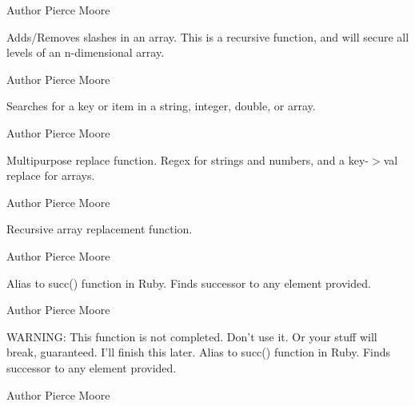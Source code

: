 \begin{DoxyAuthor}{Author}
Pierce Moore
\end{DoxyAuthor}
Adds/\-Removes slashes in an array. This is a recursive function, and will secure all levels of an n-\/dimensional array.

\begin{DoxyAuthor}{Author}
Pierce Moore
\end{DoxyAuthor}
Searches for a key or item in a string, integer, double, or array.

\begin{DoxyAuthor}{Author}
Pierce Moore
\end{DoxyAuthor}
Multipurpose replace function. Regex for strings and numbers, and a key-\/$>$val replace for arrays.

\begin{DoxyAuthor}{Author}
Pierce Moore
\end{DoxyAuthor}
Recursive array replacement function.

\begin{DoxyAuthor}{Author}
Pierce Moore
\end{DoxyAuthor}
Alias to succ() function in Ruby. Finds successor to any element provided.

\begin{DoxyAuthor}{Author}
Pierce Moore
\end{DoxyAuthor}
W\-A\-R\-N\-I\-N\-G\-: This function is not completed. Don't use it. Or your stuff will break, guaranteed. I'll finish this later. Alias to succ() function in Ruby. Finds successor to any element provided.

\begin{DoxyAuthor}{Author}
Pierce Moore 
\end{DoxyAuthor}
